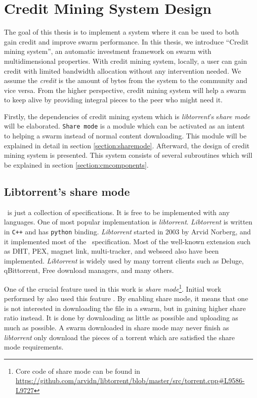 \chapter{Credit Mining System Design}
\label{chp:design}

The goal of this thesis is to implement a system where it can be used to both gain credit and improve swarm performance. In this thesis, we introduce ``Credit mining system'', an automatic investment framework on swarm with multidimensional properties. With credit mining system, locally, a user can gain credit with limited bandwidth allocation without any intervention needed. We assume the \textit{credit} is the amount of bytes from the system to the community and vice versa. From the higher perspective, credit mining system will help a swarm to keep alive by providing integral pieces to the peer who might need it. 

Firstly, the dependencies of credit mining system which is \textit{libtorrent}'s s\textit{hare mode} will be elaborated. \texttt{Share mode} is a module which can be activated as an intent to helping a swarm instead of normal content downloading. This module will be explained in detail in section \ref{section:sharemode}. Afterward, the design of credit mining system is presented. This system consists of several subroutines which will be explained in section \ref{section:cmcomponents}. 

\section{Libtorrent's share mode}
\label{section:libtorrent}
\label{section:sharemode}
\bt~is just a collection of specifications. It is free to be implemented with any languages. One of most popular implementation is \textit{libtorrent}. \textit{Libtorrent} is written in \texttt{C++} and  has \texttt{python} binding. \textit{Libtorrent} started in 2003 by Arvid Norberg, and it implemented most of the \bt~specification. Most of the well-known extension such as DHT, PEX, magnet link, multi-tracker, and webseed also have been implemented. \textit{Libtorrent} is widely used by many torrent clients such as Deluge, qBittorrent, Free download managers, and many others.

One of the crucial feature used in this work is \textit{share mode}\footnote{Core code of share mode can be found in \url{https://github.com/arvidn/libtorrent/blob/master/src/torrent.cpp\#L9586-L9727}}. Initial work performed by \citeauthor{2015:creditmining:capota} also used this feature \cite{2015:creditmining:capota}. By enabling share mode, it means that one is not interested in downloading the file in a swarm, but in gaining higher share ratio instead. It is done by downloading as little as possible and uploading as much as possible. A swarm downloaded in share mode may never finish as \textit{libtorrent} only download the pieces of a torrent which are satisfied the share mode requirements.

